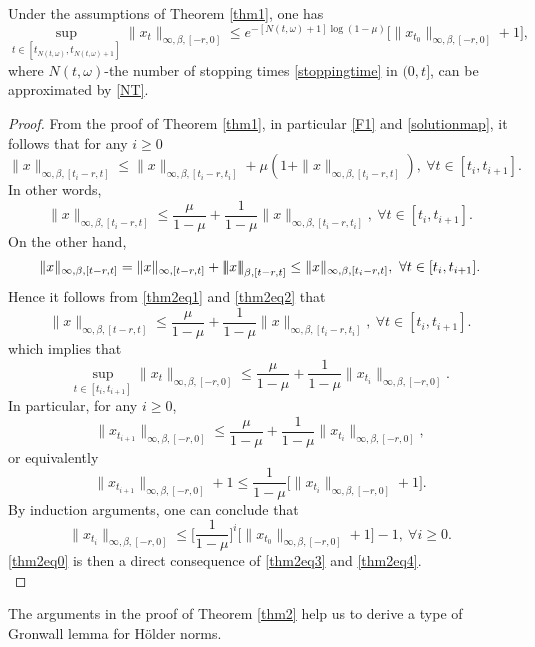 \documentclass[graybox]{svmult}
\newcommand{\ltn}{\ensuremath{\left| \! \left| \! \left|}}
\newcommand{\rtn}{\ensuremath{\right| \! \right| \! \right|}}
\begin{document}

\begin{theorem}\label{thm2}
	Under the assumptions of Theorem \ref{thm1}, one has
	\begin{equation}\label{thm2eq0}
	\sup_{t \in [t_{N(t,\omega)},t_{N(t,\omega)+1}]}\|x_t\|_{\infty,\beta,[-r,0]} \leq e^{-[N(t,\omega)+1]\log(1-\mu)} \Big[\|x_{t_0}\|_{\infty,\beta,[-r,0]} + 1 \Big],
	\end{equation}			
	where $N(t,\omega)$-the number of stopping times \eqref{stoppingtime} in $(0,t]$, can be approximated by \eqref{NT}. 
\end{theorem}


\begin{proof}
	From the proof of Theorem \ref{thm1}, in particular \eqref{F1} and \eqref{solutionmap}, it follows that for any $i \geq 0$
	\[
	\|x\|_{\infty,\beta,[t_i-r,t]} \leq \|x\|_{\infty,\beta,[t_i-r,t_i]} + \mu (1+ \|x\|_{\infty,\beta,[t_i-r,t]}),\ \forall t \in [t_i,t_{i+1}].
	\]
	In other words,
	\begin{equation}\label{thm2eq1}
	\|x\|_{\infty,\beta,[t_i-r,t]} \leq \frac{\mu}{1-\mu} + \frac{1}{1-\mu} \|x\|_{\infty,\beta,[t_i-r,t_i]},\ \forall t\in [t_i,t_{i+1}].
	\end{equation}
	On the other hand,
	\begin{eqnarray}\label{thm2eq2}
	\|x\|_{\infty,\beta,[t-r,t]} = \|x\|_{\infty,[t-r,t]} + \ltn x \rtn_{\beta,[t-r,t]} \leq \|x\|_{\infty,\beta,[t_i-r,t]},\ \forall t \in [t_i,t_{i+1}].
	\end{eqnarray}
	Hence it follows from \eqref{thm2eq1} and \eqref{thm2eq2} that
	\begin{equation*}
	\|x\|_{\infty,\beta,[t-r,t]} \leq \frac{\mu}{1-\mu}+ \frac{1}{1-\mu}\|x\|_{\infty,\beta,[t_i-r,t_i]},\ \forall t\in [t_i,t_{i+1}].
	\end{equation*}
	which implies that
	\begin{equation}\label{thm2eq3}
	\sup_{t \in [t_i,t_{i+1}]}\|x_t\|_{\infty,\beta,[-r,0]} \leq \frac{\mu}{1-\mu} + \frac{1}{1-\mu} \|x_{t_i}\|_{\infty,\beta,[-r,0]}. 
	\end{equation}
	In particular, for any $i\geq 0$,
	\[
	\|x_{t_{i+1}}\|_{\infty,\beta,[-r,0]} \leq \frac{\mu}{1-\mu} + \frac{1}{1-\mu} \|x_{t_i}\|_{\infty,\beta,[-r,0]},
	\]
	or equivalently
	\[
	\|x_{t_{i+1}}\|_{\infty,\beta,[-r,0]} + 1 \leq \frac{1}{1-\mu} \Big[\|x_{t_{i}}\|_{\infty,\beta,[-r,0]} + 1 \Big].
	\]
	By induction arguments, one can conclude that
	\begin{equation}\label{thm2eq4}
	\|x_{t_i}\|_{\infty,\beta,[-r,0]} \leq \Big[\frac{1}{1-\mu}\Big]^i \Big[\|x_{t_0}\|_{\infty,\beta,[-r,0]} + 1\Big] -1,\ \forall i\geq 0.
	\end{equation}
	\eqref{thm2eq0} is then a direct consequence of \eqref{thm2eq3} and \eqref{thm2eq4}. \\
\end{proof}
The arguments in the proof of Theorem \ref{thm2} help us to derive a type of Gronwall lemma for H\"older norms.
\end{document}
